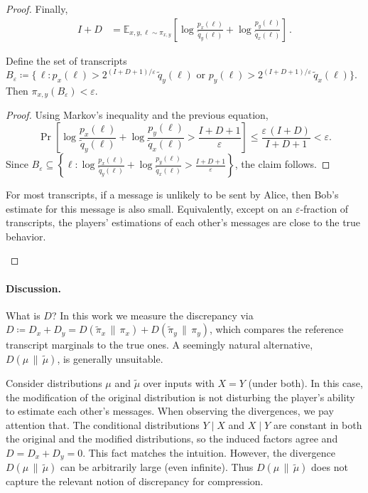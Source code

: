 \documentclass[11pt]{article}
\begin{document}
\begin{proof}
Finally,
\begin{align*}
    I + D 
    &= \mathbb{E}_{x,y,\ell \sim \pi_{x,y}} 
    \left[
       \log \frac{p_x(\ell)}{\tilde{q}_y(\ell)}
       + \log \frac{p_y(\ell)}{\tilde{q}_x(\ell)}
    \right] \,.
\end{align*}

\begin{lemma}
Define the set of transcripts $B_{\varepsilon} \coloneqq \{ \, \ell : p_x(\ell) > 2^{(I+D+1)/\varepsilon} \, \tilde{q}_y(\ell) \text{ or } p_y(\ell) > 2^{(I+D+1)/\varepsilon} \, \tilde{q}_x(\ell) \}$. Then $\pi_{x,y}(B_{\varepsilon}) < \varepsilon$.
\end{lemma}

\begin{proof}
   Using Markov's inequality and the previous equation,
   \[
     \Pr\!\left[ \log \frac{p_x(\ell)}{\tilde{q}_y(\ell)}
     + \log \frac{p_y(\ell)}{\tilde{q}_x(\ell)} > \frac{I + D + 1}{\varepsilon} \right]
     \le \frac{\varepsilon \, (I + D)}{I + D + 1}
     < \varepsilon.
   \]
   Since $B_{\varepsilon} \subseteq \left\{ \ell : \log \frac{p_x(\ell)}{\tilde{q}_y(\ell)} + \log \frac{p_y(\ell)}{\tilde{q}_x(\ell)} > \tfrac{I + D + 1}{\varepsilon} \right\}$, the claim follows.
\end{proof}

\begin{remark}
For most transcripts, if a message is unlikely to be sent by Alice, then Bob's estimate for this message is also small. Equivalently, except on an $\varepsilon$-fraction of transcripts, the players' estimations of each other's messages are close to the true behavior.
\end{remark}
\end{proof}

\paragraph{Discussion.}
What is $D$? In this work we measure the discrepancy via
$D \coloneqq D_x + D_y = D(\tilde{\pi}_x\,\|\,\pi_x) + D(\tilde{\pi}_y\,\|\,\pi_y)$,
which compares the reference transcript marginals to the true ones. A seemingly natural alternative, $D(\mu\,\|\,\tilde{\mu})$, is generally unsuitable.

\begin{example}
Consider distributions $\mu$ and $\tilde{\mu}$ over inputs with $X=Y$  (under both). 
In this case, the modification of the original distribution is not disturbing the player's ability to estimate each other's messages.
When observing the divergences, we pay attention that.
The conditional distributions $Y\mid X$ and $X\mid Y$ are constant in both the original and the modified distributions, so the induced factors agree and $D = D_x + D_y = 0$.
This fact matches the intuition.
However, the divergence $D(\mu\,\|\,\tilde{\mu})$ can be arbitrarily large (even infinite). Thus $D(\mu\,\|\,\tilde{\mu})$ does not capture the relevant notion of discrepancy for compression.
\end{example}

\nocite{*}


\end{document}
